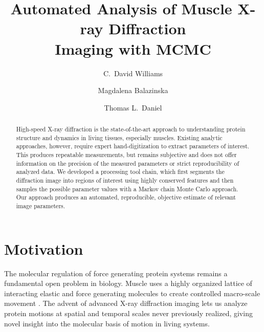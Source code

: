 \documentclass{llncs}
\begin{document}
\frontmatter
\pagestyle{headings}  %


\mainmatter
\title{Automated Analysis of Muscle X-ray Diffraction \\ Imaging with MCMC}
\author{C.\ David Williams \and Magdalena Balazinska \and Thomas L.\ Daniel}
\maketitle


\begin{abstract}

  High-speed X-ray diffraction is the state-of-the-art approach to
  understanding protein structure and dynamics in living tissues,
  especially muscles.  Existing analytic approaches, however, require
  expert hand-digitization to extract parameters of interest. This
  produces repeatable measurements, but remains subjective and does
  not offer information on the precision of the measured parameters or
  strict reproducibility of analyzed data.  We developed a processing
  tool chain, which first segments the diffraction image into regions
  of interest using highly conserved features and then samples the
  possible parameter values with a Markov chain Monte Carlo approach.
  Our approach produces an automated, reproducible, objective estimate
  of relevant image parameters.
\end{abstract}


\section{Motivation}
\label{sec:motivation}


The molecular regulation of force generating protein systems remains a
fundamental open problem in biology. Muscle uses a highly organized
lattice of interacting elastic and force generating molecules to
create controlled macro-scale movement \cite{Reedy1965,Millman1998}.
The advent of advanced X-ray diffraction imaging lets us analyze
protein motions at spatial and temporal scales never previously
realized, giving novel insight into the molecular basis of motion in
living systems.  
\end{document}
